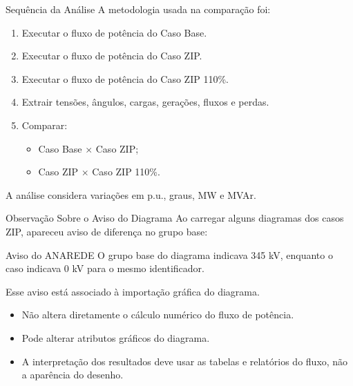 \documentclass[aspectratio=169,11pt]{beamer}
\newcommand{\casobase}{Caso Base}
\newcommand{\casozip}{Caso ZIP}
\newcommand{\casozipcento}{Caso ZIP 110\%}
\newcommand{\pu}{p.u.}
\begin{document}
\begin{frame}{Sequência da Análise}
  A metodologia usada na comparação foi:

  \begin{enumerate}
    \item Executar o fluxo de potência do \casobase.
    \item Executar o fluxo de potência do \casozip.
    \item Executar o fluxo de potência do \casozipcento.
    \item Extrair tensões, ângulos, cargas, gerações, fluxos e perdas.
    \item Comparar:
      \begin{itemize}
        \item \casobase{} $\times$ \casozip;
        \item \casozip{} $\times$ \casozipcento.
      \end{itemize}
  \end{enumerate}

  \vspace{0.15cm}
  A análise considera variações em \pu, graus, MW e MVAr.
\end{frame}

\begin{frame}{Observação Sobre o Aviso do Diagrama}
  Ao carregar alguns diagramas dos casos ZIP, apareceu aviso de diferença no grupo base:

  \begin{block}{Aviso do ANAREDE}
    O grupo base do diagrama indicava 345 kV, enquanto o caso indicava 0 kV para o mesmo identificador.
  \end{block}

  Esse aviso está associado à importação gráfica do diagrama.

  \begin{itemize}
    \item Não altera diretamente o cálculo numérico do fluxo de potência.
    \item Pode alterar atributos gráficos do diagrama.
    \item A interpretação dos resultados deve usar as tabelas e relatórios do fluxo, não a aparência do desenho.
  \end{itemize}
\end{frame}
\end{document}
